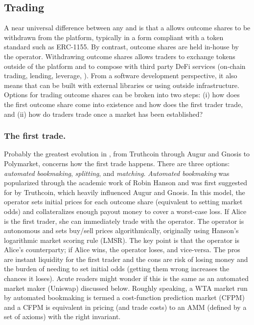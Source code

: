 
\subsection{Trading}\label{wf:trade}

A near universal difference between any \cepm and \depm is that a \depm allows outcome shares to be withdrawn from the platform, typically in a form compliant with a token standard such as ERC-1155. By contrast, \cepm outcome shares are held in-house by the operator. Withdrawing outcome shares allows traders to exchange tokens outside of the platform and to compose with third party DeFi services (\eg on-chain trading, lending, leverage, \etc). From a software development perspective, it also means that \depms can be built with external libraries or using outside infrastructure.  Options for trading outcome shares can be broken into two steps: (i) how does the first outcome share come into existence and how does the first trader trade, and (ii) how do traders trade once a market has been established? 

\subsubsection{The first trade.} Probably the greatest evolution in \depms, from Truthcoin through Augur and Gnosis to Polymarket, concerns how the first trade happens. There are three options: \textit{automated bookmaking}, \textit{splitting}, and \textit{matching}. \textit{Automated bookmaking} was popularized through the academic work of Robin Hanson and was first suggested for \depms by Truthcoin, which heavily influenced Augur and Gnosis. In this model, the operator sets initial prices for each outcome share (equivalent to setting market odds) and collateralizes enough payout money to cover a worst-case loss. If Alice is the first trader, she can immediately trade with the operator. The operator is autonomous and sets buy/sell prices algorithmically, originally using Hanson's logarithmic market scoring rule (LMSR). The key point is that the operator is Alice's counterparty; if Alice wins, the operator loses, and vice-versa. The pros are instant liquidity for the first trader and the cons are risk of losing money and the burden of needing to set initial odds (getting them wrong increases the chances it loses). Acute readers might wonder if this is the same as an automated market maker (\eg Uniswap) discussed below. Roughly speaking, a WTA market run by automated bookmaking is termed a cost-function prediction market (CFPM) and a CFPM is equivalent in pricing (and trade costs) to an AMM (defined by a set of axioms) with the right invariant.

